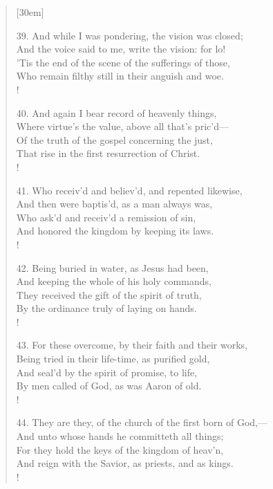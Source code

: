 \begin{verse}[30em]
\begin{altverse}
				39. And while I was pondering, the vision was closed; \\ 
				And the voice said to me, write the vision: for lo! \\ 
				'Tis the end of the scene of the sufferings of those, \\ 
				Who remain filthy still in their anguish and woe. \\! 
				 
				40. And again I bear record of heavenly things, \\ 
				Where virtue's the value, above all that's pric'd--- \\ 
				Of the truth of the gospel concerning the just, \\ 
				That rise in the first resurrection of Christ. \\!
				 
				41. Who receiv'd and believ'd, and repented likewise, \\ 
				And then were baptis'd, as a man always was, \\ 
				Who ask'd and receiv'd a remission of sin, \\ 
				And honored the kingdom by keeping its laws. \\!
				 
				42. Being buried in water, as Jesus had been, \\ 
				And keeping the whole of his holy commands, \\ 
				They received the gift of the spirit of truth, \\ 
				By the ordinance truly of laying on hands. \\!
				 
				43. For these overcome, by their faith and their works, \\ 
				Being tried in their life-time, as purified gold, \\ 
				And seal'd by the spirit of promise, to life, \\ 
				By men called of God, as was Aaron of old. \\!
				 
				44. They are they, of the church of the first born of God,--- \\ 
				And unto whose hands he committeth all things; \\ 
				For they hold the keys of the kingdom of heav'n, \\ 
				And reign with the Savior, as priests, and as kings. \\!
				 

\end{altverse}
\end{verse}
